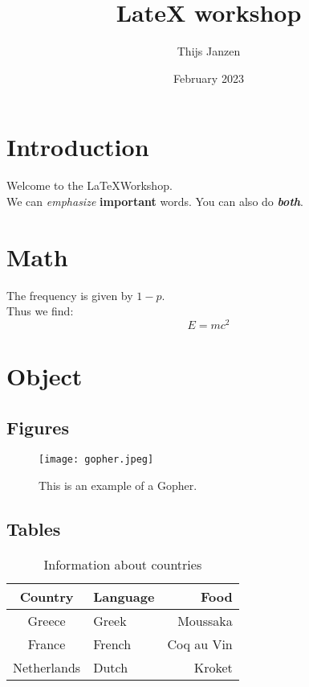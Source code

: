 \documentclass{article}
\title{LateX workshop}
\author{Thijs Janzen}
\date{February 2023}
\begin{document}
\maketitle

\section{Introduction}
Welcome to the \LaTeX Workshop. \\
We can \textit{emphasize} \textbf{important} words.
You can also do \textit{\textbf{both}}.

\section*{Math}
The frequency is given by $1 - p$. \\
Thus we find:
\begin{equation}
\label{eq:einstein}
    E = mc^2
\end{equation}

\section{Object} \label{sec:object}
\subsection{Figures}
\begin{figure}[p]
    \centering
    \texttt{[image: gopher.jpeg]}
    \caption{This is an example of a Gopher.}
    \label{fig:gopher_picture}
\end{figure}

\subsection{Tables}

\begin{table}[h]
    \centering
    \begin{tabular}{|c|l|r|}
    \hline
        \textbf{Country}     & \textbf{Language} & \textbf{Food} \\
    \hline
        Greece      & Greek & Moussaka \\
        France      & French & Coq au Vin \\
        Netherlands & Dutch & Kroket \\
    \hline
    \end{tabular}
    \caption{Information about countries}
    \label{tab:country_table}
\end{table}
\end{document}

